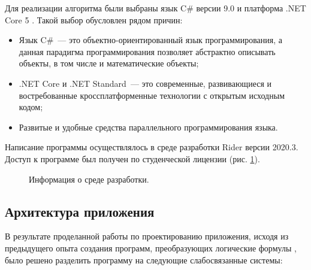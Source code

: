 Для реализации алгоритма были выбраны язык C\# версии 9.0 и платформа .NET Core 5 \cite{TroelsonNet}. Такой выбор обусловлен рядом причин:
\begin{itemize}
    \item Язык C\#~--- это объектно-ориентированный язык программирования, а данная парадигма программирования позволяет абстрактно описывать объекты, в том числе и математические объекты; 
    \item .NET Core и .NET Standard~--- это современные, развивающиеся и востребованные кроссплатформенные технологии с открытым исходным кодом;
    \item Развитые и удобные средства параллельного программирования языка.
\end{itemize}

Написание программы осуществлялось в среде разработки Rider версии 2020.3. Доступ к программе был получен по студенческой лицензии (рис. \ref{fig:ide}).

\begin{figure}[ht]
    \begin{center}
        \begin{minipage}[ht]{0.8\linewidth}
        \end{minipage} 
    \end{center}
    \caption{Информация о среде разработки.}  
    \label{fig:ide}
\end{figure}

\subsection{Архитектура приложения}

В результате проделанной работы по проектированию приложения, исходя из предыдущего опыта создания программ, преобразующих логические формулы \cite{Gibadulin1}, было решено разделить программу на следующие слабосвязанные системы:

